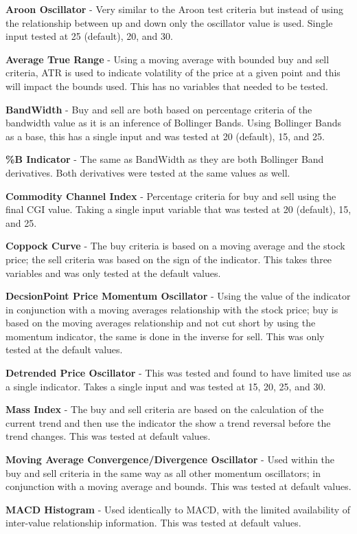 \documentclass[conference]{IEEEtran}
\begin{document}
\textbf{Aroon Oscillator} - Very similar to the Aroon test criteria but instead of using the relationship between up and down only the oscillator value is used. Single input tested at 25 (default), 20, and 30.

\textbf{Average True Range} - Using a moving average with bounded buy and sell criteria, ATR is used to indicate volatility of the price at a given point and this will impact the bounds used. This has no variables that needed to be tested. 

\textbf{BandWidth} - Buy and sell are both based on percentage criteria of the bandwidth value as it is an inference of Bollinger Bands. Using Bollinger Bands as a base, this has a single input and was tested at 20 (default), 15, and 25.

\textbf{\%B Indicator} - The same as BandWidth as they are both Bollinger Band derivatives. Both derivatives were tested at the same values as well.

\textbf{Commodity Channel Index} - Percentage criteria for buy and sell using the final CGI value. Taking a single input variable that was tested at 20 (default), 15, and 25.

\textbf{Coppock Curve} - The buy criteria is based on a moving average and the stock price; the sell criteria was based on the sign of the indicator. This takes three variables and was only tested at the default values.

\textbf{DecsionPoint Price Momentum Oscillator} - Using the value of the indicator in conjunction with a moving averages relationship with the stock price; buy is based on the moving averages relationship and not cut short by using the momentum indicator, the same is done in the inverse for sell. This was only tested at the default values.

\textbf{Detrended Price Oscillator} - This was tested and found to have limited use as a single indicator. Takes a single input and was tested at 15, 20, 25, and 30.

\textbf{Mass Index} - The buy and sell criteria are based on the calculation of the current trend and then use the indicator the show a trend reversal before the trend changes. This was tested at default values.

\textbf{Moving Average Convergence/Divergence Oscillator} - Used within the buy and sell criteria in the same way as all other momentum oscillators; in conjunction with a moving average and bounds. This was tested at default values.

\textbf{MACD Histogram} - Used identically to MACD, with the limited availability of inter-value relationship information. This was tested at default values. 
\end{document}
